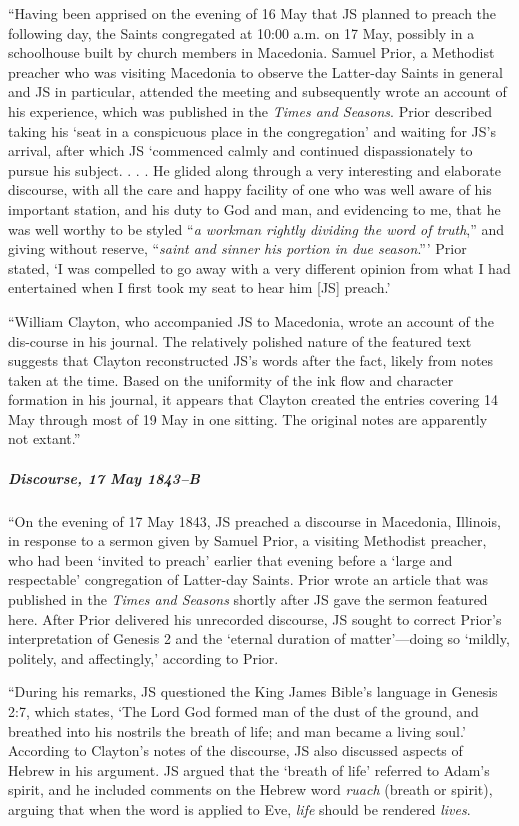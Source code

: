 				``Having been apprised on the evening of 16 May that JS planned to preach the following day, the Saints congregated at 10:00 a.m. on 17 May, possibly in a schoolhouse built by church members in Macedonia. Samuel Prior, a Methodist preacher who was visiting Macedonia to observe the Latter-day Saints in general and JS in particular, attended the meeting and subsequently wrote an account of his experience, which was published in the \textit{Times and Seasons}. Prior described taking his `seat in a conspicuous place in the congregation' and waiting for JS's arrival, after which JS `commenced calmly and continued dispassionately to pursue his subject. . . . He glided along through a very interesting and elaborate discourse, with all the care and happy facility of one who was well aware of his important station, and his duty to God and man, and evidencing to me, that he was well worthy to be styled ``\textit{a workman rightly dividing the word of truth},'' and giving without reserve, ``\textit{saint and sinner his portion in due season}.''' Prior stated, `I was compelled to go away with a very different opinion from what I had entertained when I first took my seat to hear him [JS] preach.'

				``William Clayton, who accompanied JS to Macedonia, wrote an account of the dis-course in his journal. The relatively polished nature of the featured text suggests that Clayton reconstructed JS's words after the fact, likely from notes taken at the time. Based on the uniformity of the ink flow and character formation in his journal, it appears that Clayton created the entries covering 14 May through most of 19 May in one sitting. The original notes are apparently not extant.''
				
			\subparagraph{Discourse, 17 May 1843--B}
			
				``On the evening of 17 May 1843, JS preached a discourse in Macedonia, Illinois, in response to a sermon given by Samuel Prior, a visiting Methodist preacher, who had been `invited to preach' earlier that evening before a `large and respectable' congregation of Latter-day Saints. Prior wrote an article that was published in the \textit{Times and Seasons} shortly after JS gave the sermon featured here. After Prior delivered his unrecorded discourse, JS sought to correct Prior's interpretation of Genesis 2 and the `eternal duration of matter'---doing so `mildly, politely, and affectingly,' according to Prior.

				``During his remarks, JS questioned the King James Bible's language in Genesis 2:7, which states, `The Lord God formed man of the dust of the ground, and breathed into his nostrils the breath of life; and man became a living soul.' According to Clayton's notes of the discourse, JS also discussed aspects of Hebrew in his argument. JS argued that the `breath of life' referred to Adam's spirit, and he included comments on the Hebrew word \textit{ruach} (breath or spirit), arguing that when the word is applied to Eve, \textit{life} should be rendered \textit{lives}.

